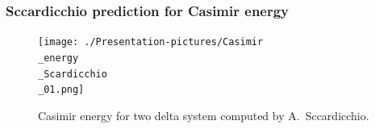 \documentclass[10pt,t]{beamer}
\begin{document}
\begin{frame}
  \frametitle{Sccardicchio prediction for Casimir energy}


  \begin{figure}

    \label{fig:Casimir-energy-Scardicchio}

    \centering


    \texttt{[image: ./Presentation-pictures/Casimir\\\_energy\\\_Scardicchio\\\_01.png]}

    \caption{Casimir energy for two delta system computed by
      A.~Sccardicchio.}


  \end{figure}

\end{frame}
\end{document}
